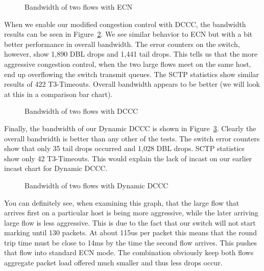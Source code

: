 \documentclass[12pt]{article}
\begin{document}
\begin{figure}[h]
\centering
{}
\caption{Bandwidth of two flows with ECN}
\label{fig:ecnBw}
\end{figure}


\newpage

When we enable our modified congestion control with DCCC, the bandwidth results can
be seen in Figure~\ref{fig:dcccBw}.  We see similar behavior to ECN but with a bit better performance in
overall bandwidth. The error counters on the switch, however,
show 1,890 DBL drops and 1,441 tail drops. This tells us that  the more aggressive congestion
control, when the two large flows meet on the same host, end up overflowing the switch
transmit queues. The SCTP statistics show similar results of 422 T3-Timeouts. Overall bandwidth
appears to be better (we will look at this in a comparison bar chart).


\begin{figure}[h]
\centering
{}
\caption{Bandwidth of two flows with DCCC}
\label{fig:dcccBw}
\end{figure}


\newpage

Finally, the bandwidth of our Dynamic DCCC is shown in Figure~\ref{fig:dynBw}. Clearly the
overall bandwidth is better than any other of the tests. The switch error counters show that only 35 tail
drops occurred and 1,028 DBL drops. SCTP statistics show only 42 T3-Timeouts. This would explain
the lack of incast on our earlier incast chart for Dynamic DCCC.

\begin{figure}[h]
\centering
{}
\caption{Bandwidth of two flows with Dynamic DCCC}
\label{fig:dynBw}
\end{figure}


You can definitely see, when examining this graph, that the large flow that arrives first on a particular
host is being more aggressive, while the later arriving large flow is less aggressive. This is due to
the fact that our switch will not start marking until 130 packets. At about 115us per packet this means
that the round trip time must be close to 14ms by the time the second flow arrives. This pushes that
flow into standard ECN mode. The combination obviously keep both flows aggregate packet load
offered much smaller and thus less drops occur.
\end{document}
